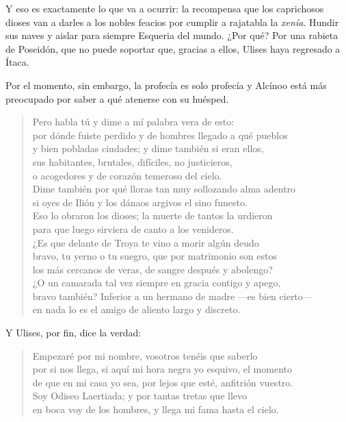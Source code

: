 \documentclass[11pt,a4paper]{article}
\begin{document}
Y eso es exactamente lo que va a ocurrir: la recompensa que los caprichosos dioses van a darles a los nobles feacios por cumplir a rajatabla la \emph{xenía}. Hundir sus naves y aislar para siempre Esqueria del mundo. ¿Por qué? Por una rabieta de Poseidón, que no puede soportar que, gracias a ellos, Ulises haya regresado a Ítaca.

Por el momento, sin embargo, la profecía es solo profecía y Alcínoo está más preocupado por saber a qué atenerse con su huésped.

\begin{verse}
Pero habla tú y dime a mí palabra vera de esto:\\
por dónde fuiste perdido y de hombres llegado a qué pueblos\\
y bien pobladas ciudades; y dime también si eran ellos,\\
sus habitantes, brutales, difíciles, no justicieros,\\
o acogedores y de corazón temeroso del cielo.\\
Dime también por qué lloras tan muy sollozando alma adentro\\
si oyes de Ilión y los dánaos argivos el sino funesto.\\
Eso lo obraron los dioses; la muerte de tantos la urdieron\\
para que luego sirviera de canto a los venideros.\\
¿Es que delante de Troya te vino a morir algún deudo\\
bravo, tu yerno o tu suegro, que por matrimonio son estos\\
los más cercanos de veras, de sangre después y abolengo?\\
¿O un camarada tal vez siempre en gracia contigo y apego,\\
bravo también? Inferior a un hermano de madre ---es bien cierto---\\
en nada lo es el amigo de aliento largo y discreto.
\end{verse}

Y Ulises, por fin, dice la verdad:

\begin{verse}
Empezaré por mi nombre, vosotros tenéis que saberlo\\
por si nos llega, si aquí mi hora negra yo esquivo, el momento\\
de que en mi casa yo sea, por lejos que esté, anfitrión vuestro.\\
Soy Odiseo Laertiada; y por tantas tretas que llevo\\
en boca voy de los hombres, y llega mi fama hasta el cielo.
\end{verse}
\end{document}
